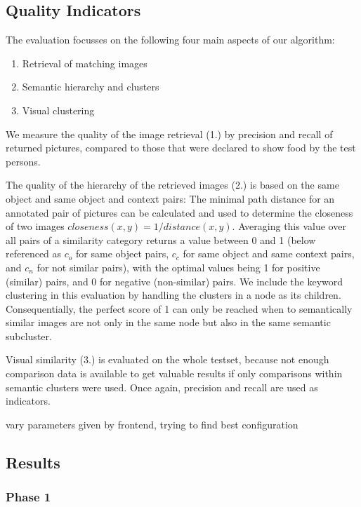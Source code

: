 \subsection{Quality Indicators}
The evaluation focusses on the following four main aspects of our algorithm:
\begin{enumerate}
\item Retrieval of matching images
\item Semantic hierarchy and clusters
\item Visual clustering
\end{enumerate}

We measure the quality of the image retrieval (1.) by precision and recall of returned pictures, compared to those that were declared to show food by the test persons.  

The quality of the hierarchy of the retrieved images (2.) is based on the same object and same object and context pairs: The  minimal path distance for an annotated pair of pictures can be calculated and used to determine the closeness of two images $closeness(x,y) = 1/distance(x,y)$. Averaging this value over all pairs of a similarity category returns a value between 0 and 1 (below referenced as $c_o$ for same object pairs, $c_c$ for same object and same context pairs, and $c_n$ for not similar pairs), with the optimal values being 1 for positive (similar) pairs, and 0 for negative (non-similar) pairs. We include the keyword clustering in this evaluation by handling the clusters in a node as its children. Consequentially, the perfect score of 1 can only be reached when to semantically similar images are not only in the same node but also in the same semantic subcluster.

Visual similarity (3.) is evaluated on the whole testset, because not enough comparison data is available to get valuable results if only comparisons within semantic clusters were used. Once again, precision and recall are used as indicators.

vary parameters given by frontend, trying to find best configuration

\subsection{Results}
\label{sec_results}

\subsubsection{Phase 1}

